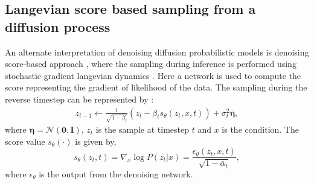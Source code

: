 \documentclass[10pt,twocolumn,letterpaper]{article}
\begin{document}
\subsection{Langevian score based sampling from a diffusion process}
\label{sec:score}
An alternate interpretation of denoising diffusion probabilistic models is denoising score-based approach \cite{song2019generative}, where the sampling during inference is performed using stochastic gradient langevian dynamics \cite{welling2011bayesian}. Here a network is used to compute the score representing the gradient of likelihood of the data. The sampling during the reverse timestep  can be represented by \cite{song2019generative}:
\begin{multline}
    z_{t-1} \leftarrow{} \frac{1}{\sqrt{1-\beta_t}} \left( z_t -  \beta_t s_{\theta}(z_t, x, t) \right) + \sigma_t^2 \boldsymbol{\eta},
    \label{eq:score}
\end{multline}
where $\boldsymbol{\eta} = \mathcal{N}(\boldsymbol{0}, \boldsymbol{I})$, $z_t$ is the sample at timestep $t$ and $x$ is the condition. The score value  $s_{\theta}(\cdot)$ is  given by,
\begin{equation}
    s_{\theta}(z_t,t) =\nabla_x \log P(z_t|x) =\frac{\epsilon_{\theta}(z_t,x,t)}{\sqrt{1-\bar{\alpha}_t}},
\end{equation}
 where $\epsilon_{\theta}$ is the output from the denoising network.
 
\end{document}
